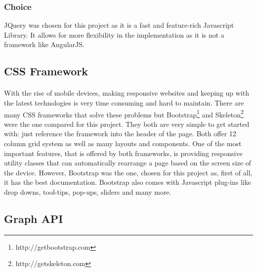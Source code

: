 \documentclass{l4proj}
\begin{document}
\subsubsection{Choice}
JQuery was chosen for this project as it is a fast and feature-rich Javascript Library. It allows for more flexibility in the implementation as it is not a framework like AngularJS. 

\subsection{CSS Framework}
\paragraph{}
With the rise of mobile devices, making responsive websites and keeping up with the latest technologies is very time consuming and hard to maintain. There are many CSS frameworks that solve these problems but Bootstrap\footnote{http://getbootstrap.com} and Skeleton\footnote{http://getskeleton.com} were the one compared for this project. They both are very simple to get started with: just reference the framework into the header of the page. Both offer 12 column grid system as well as many layouts and components. One of the most important features, that is offered by both frameworks, is providing responsive utility classes that can automatically rearrange a page based on the screen size of the device. However, Bootstrap was the one, chosen for this project as, first of all, it has the best documentation. Bootstrap also comes with Javascript plug-ins like drop downs, tool-tips, pop-ups, sliders and many more.   

\subsection{Graph API}
\end{document}
